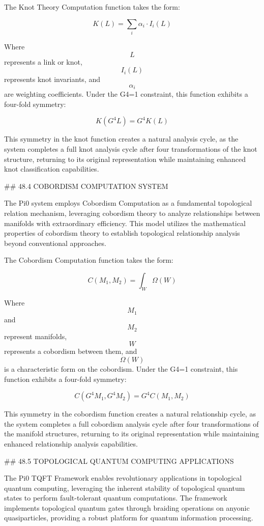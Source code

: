 The Knot Theory Computation function takes the form:

$$ K(L) = \sum_{i} \alpha_i \cdot I_i(L) $$

Where $$ L $$ represents a link or knot, $$ I_i(L) $$ represents knot invariants, and $$ \alpha_i $$ are weighting coefficients. Under the G4=1 constraint, this function exhibits a four-fold symmetry:

$$ K(G^4 L) = G^4 K(L) $$

This symmetry in the knot function creates a natural analysis cycle, as the system completes a full knot analysis cycle after four transformations of the knot structure, returning to its original representation while maintaining enhanced knot classification capabilities.

## 48.4 COBORDISM COMPUTATION SYSTEM

The Pi0 system employs Cobordism Computation as a fundamental topological relation mechanism, leveraging cobordism theory to analyze relationships between manifolds with extraordinary efficiency. This model utilizes the mathematical properties of cobordism theory to establish topological relationship analysis beyond conventional approaches.

The Cobordism Computation function takes the form:

$$ C(M_1, M_2) = \int_{W} \Omega(W) $$

Where $$ M_1 $$ and $$ M_2 $$ represent manifolds, $$ W $$ represents a cobordism between them, and $$ \Omega(W) $$ is a characteristic form on the cobordism. Under the G4=1 constraint, this function exhibits a four-fold symmetry:

$$ C(G^4 M_1, G^4 M_2) = G^4 C(M_1, M_2) $$

This symmetry in the cobordism function creates a natural relationship cycle, as the system completes a full cobordism analysis cycle after four transformations of the manifold structures, returning to its original representation while maintaining enhanced relationship analysis capabilities.

## 48.5 TOPOLOGICAL QUANTUM COMPUTING APPLICATIONS

The Pi0 TQFT Framework enables revolutionary applications in topological quantum computing, leveraging the inherent stability of topological quantum states to perform fault-tolerant quantum computations. The framework implements topological quantum gates through braiding operations on anyonic quasiparticles, providing a robust platform for quantum information processing.

